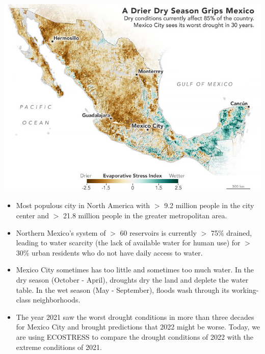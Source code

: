 \documentclass[oneside,a4paper,11pt,explicit]{book}
\begin{document}

\begin{tcolorbox}[colback=yellow!5!white,colframe=IceCreamLeaf,title=\textbf{Today's Study Location : Mexico City}]
	\begin{multicols}{2}

	\centerline{\includegraphics[width=\columnwidth]{mexico_esi_2021.png}}

	\columnbreak
		\begin{itemize}
			\item Most populous city in North America with $>$ 9.2 million people in the city center and $>$ 21.8 million people in the greater metropolitan area. 
			\item Northern Mexico's system of $>$ 60 reservoirs is currently $>$ 75\% drained, leading to water scarcity (the lack of available water for human use) for $>$ 30\% urban residents who do not have daily access to water.
		\end{itemize}
	\end{multicols}

	\begin{itemize}
		\item Mexico City sometimes has too little and sometimes too much water. In the dry season (October - April), droughts dry the land and deplete the water table. In the wet season (May - September), floods wash through its working-class neighborhoods.
		\item The year 2021 saw the worst drought conditions in more than three decades for Mexico City and brought predictions that 2022 might be worse. Today, we are using ECOSTRESS to compare the drought conditions of 2022 with the extreme conditions of 2021.
	\end{itemize}

\end{tcolorbox}
\end{document}
